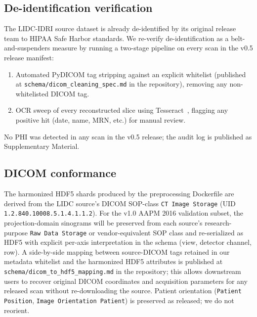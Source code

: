 \documentclass[twoside,11pt]{article}
\begin{document}
\subsection*{De-identification verification}

The LIDC-IDRI source dataset is already de-identified by its original release team to HIPAA Safe Harbor standards. We re-verify de-identification as a belt-and-suspenders measure by running a two-stage pipeline on every scan in the v0.5 release manifest:

\begin{enumerate}
    \item Automated PyDICOM tag stripping against an explicit whitelist (published at \texttt{schema/dicom\_cleaning\_spec.md} in the repository), removing any non-whitelisted DICOM tag.
    \item OCR sweep of every reconstructed slice using Tesseract~\citep{tesseract2007}, flagging any positive hit (date, name, MRN, etc.) for manual review.
\end{enumerate}

No PHI was detected in any scan in the v0.5 release; the audit log is published as Supplementary Material.

\subsection*{DICOM conformance}

The harmonized HDF5 shards produced by the preprocessing Dockerfile are derived from the LIDC source's DICOM SOP-class \texttt{CT Image Storage} (UID \texttt{1.2.840.10008.5.1.4.1.1.2}). For the v1.0 AAPM 2016 validation subset, the projection-domain sinograms will be preserved from each source's research-purpose \texttt{Raw Data Storage} or vendor-equivalent SOP class and re-serialized as HDF5 with explicit per-axis interpretation in the schema (view, detector channel, row). A side-by-side mapping between source-DICOM tags retained in our metadata whitelist and the harmonized HDF5 attributes is published at \texttt{schema/dicom\_to\_hdf5\_mapping.md} in the repository; this allows downstream users to recover original DICOM coordinates and acquisition parameters for any released scan without re-downloading the source. Patient orientation (\texttt{Patient Position}, \texttt{Image Orientation Patient}) is preserved as released; we do not reorient.
\end{document}
